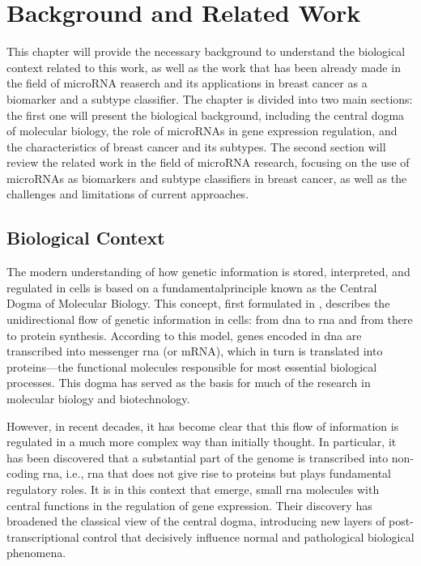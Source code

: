 
%

\chapter{Background and Related Work}

This chapter will provide the necessary background to understand the biological
context related to this work, as well as the work that has been already made in
the field of microRNA reaserch and its applications in breast cancer as a
biomarker and a subtype classifier. The chapter is divided into two main
sections: the first one will present the biological background, including the
central dogma of molecular biology, the role of microRNAs in gene expression
regulation, and the characteristics of breast cancer and its subtypes. The
second section will review the related work in the field of microRNA research,
focusing on the use of microRNAs as biomarkers and subtype classifiers in
breast cancer, as well as the challenges and limitations of current approaches.

\section{Biological Context}
The modern understanding of how genetic information is stored, interpreted, and
regulated in cells is based on a fundamentalprinciple known as the Central
Dogma of Molecular Biology. This concept, first formulated in
\textcites{discovery_dna_Watson1953The, updated_disc_of_dna_Pray2008DNA},
describes the unidirectional flow of genetic information in cells: from
\gls{dna} to \gls{rna} and from there to protein synthesis. According to this
model, genes encoded in \gls{dna} are transcribed into messenger \gls{rna} (or
mRNA), which in turn is translated into proteins—the functional molecules
responsible for most essential biological processes. This dogma has served as
the basis for much of the research in molecular biology and biotechnology.

However, in recent decades, it has become clear that this flow of information
is regulated in a much more complex way than initially thought. In particular,
it has been discovered that a substantial part of the genome is transcribed
into non-coding \gls{rna}, i.e., \gls{rna} that does not give rise to proteins
but plays fundamental regulatory roles. It is in this context that
 emerge, small \gls{rna} molecules with central functions in
the regulation of gene expression. Their discovery has broadened the classical
view of the central dogma, introducing new layers of post-transcriptional
control that decisively influence normal and pathological biological phenomena.

